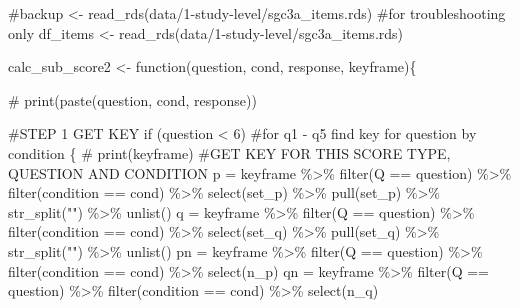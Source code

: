 \documentclass[
  letterpaper,
  DIV=11,
  numbers=noendperiod]{scrreprt}
\newenvironment{Shaded}{\begin{snugshade}}{\end{snugshade}}
\newcommand{\CommentTok}[1]{\textcolor[rgb]{0.37,0.37,0.37}{#1}}
\newcommand{\ControlFlowTok}[1]{\textcolor[rgb]{0.00,0.23,0.31}{#1}}
\newcommand{\DecValTok}[1]{\textcolor[rgb]{0.68,0.00,0.00}{#1}}
\newcommand{\FunctionTok}[1]{\textcolor[rgb]{0.28,0.35,0.67}{#1}}
\newcommand{\NormalTok}[1]{\textcolor[rgb]{0.00,0.23,0.31}{#1}}
\newcommand{\OtherTok}[1]{\textcolor[rgb]{0.00,0.23,0.31}{#1}}
\newcommand{\SpecialCharTok}[1]{\textcolor[rgb]{0.37,0.37,0.37}{#1}}
\newcommand{\StringTok}[1]{\textcolor[rgb]{0.13,0.47,0.30}{#1}}
\begin{document}
\begin{Shaded}
\begin{Highlighting}[]
\CommentTok{\#backup \textless{}{-} read\_rds(\textquotesingle{}data/1{-}study{-}level/sgc3a\_items.rds\textquotesingle{}) \#for troubleshooting only}
\NormalTok{df\_items }\OtherTok{\textless{}{-}} \FunctionTok{read\_rds}\NormalTok{(}\StringTok{\textquotesingle{}data/1{-}study{-}level/sgc3a\_items.rds\textquotesingle{}}\NormalTok{)}
\end{Highlighting}
\end{Shaded}

\begin{Shaded}
\begin{Highlighting}[]
\NormalTok{calc\_sub\_score2 }\OtherTok{\textless{}{-}} \ControlFlowTok{function}\NormalTok{(question, cond, response, keyframe)\{}

  \CommentTok{\# print(paste(question, cond, response))}

    \CommentTok{\#STEP 1 GET KEY}
  \ControlFlowTok{if}\NormalTok{ (question }\SpecialCharTok{\textless{}} \DecValTok{6}\NormalTok{) }\CommentTok{\#for q1 {-} q5 find key for question by condition}
\NormalTok{  \{}
    \CommentTok{\# print(keyframe)}
    \CommentTok{\#GET KEY FOR THIS SCORE TYPE, QUESTION AND CONDITION}
\NormalTok{    p }\OtherTok{=}\NormalTok{  keyframe }\SpecialCharTok{\%\textgreater{}\%} \FunctionTok{filter}\NormalTok{(Q }\SpecialCharTok{==}\NormalTok{ question) }\SpecialCharTok{\%\textgreater{}\%} \FunctionTok{filter}\NormalTok{(condition }\SpecialCharTok{==}\NormalTok{ cond) }\SpecialCharTok{\%\textgreater{}\%} \FunctionTok{select}\NormalTok{(set\_p) }\SpecialCharTok{\%\textgreater{}\%} \FunctionTok{pull}\NormalTok{(set\_p) }\SpecialCharTok{\%\textgreater{}\%} \FunctionTok{str\_split}\NormalTok{(}\StringTok{""}\NormalTok{) }\SpecialCharTok{\%\textgreater{}\%} \FunctionTok{unlist}\NormalTok{()}
\NormalTok{    q }\OtherTok{=}\NormalTok{  keyframe }\SpecialCharTok{\%\textgreater{}\%} \FunctionTok{filter}\NormalTok{(Q }\SpecialCharTok{==}\NormalTok{ question) }\SpecialCharTok{\%\textgreater{}\%} \FunctionTok{filter}\NormalTok{(condition }\SpecialCharTok{==}\NormalTok{ cond) }\SpecialCharTok{\%\textgreater{}\%} \FunctionTok{select}\NormalTok{(set\_q) }\SpecialCharTok{\%\textgreater{}\%} \FunctionTok{pull}\NormalTok{(set\_q) }\SpecialCharTok{\%\textgreater{}\%} \FunctionTok{str\_split}\NormalTok{(}\StringTok{""}\NormalTok{) }\SpecialCharTok{\%\textgreater{}\%} \FunctionTok{unlist}\NormalTok{()}
\NormalTok{    pn }\OtherTok{=}\NormalTok{ keyframe }\SpecialCharTok{\%\textgreater{}\%} \FunctionTok{filter}\NormalTok{(Q }\SpecialCharTok{==}\NormalTok{ question) }\SpecialCharTok{\%\textgreater{}\%} \FunctionTok{filter}\NormalTok{(condition }\SpecialCharTok{==}\NormalTok{ cond) }\SpecialCharTok{\%\textgreater{}\%} \FunctionTok{select}\NormalTok{(n\_p)}
\NormalTok{    qn }\OtherTok{=}\NormalTok{ keyframe }\SpecialCharTok{\%\textgreater{}\%} \FunctionTok{filter}\NormalTok{(Q }\SpecialCharTok{==}\NormalTok{ question) }\SpecialCharTok{\%\textgreater{}\%} \FunctionTok{filter}\NormalTok{(condition }\SpecialCharTok{==}\NormalTok{ cond) }\SpecialCharTok{\%\textgreater{}\%} \FunctionTok{select}\NormalTok{(n\_q)}


\end{Highlighting}
\end{Shaded}
\end{document}
